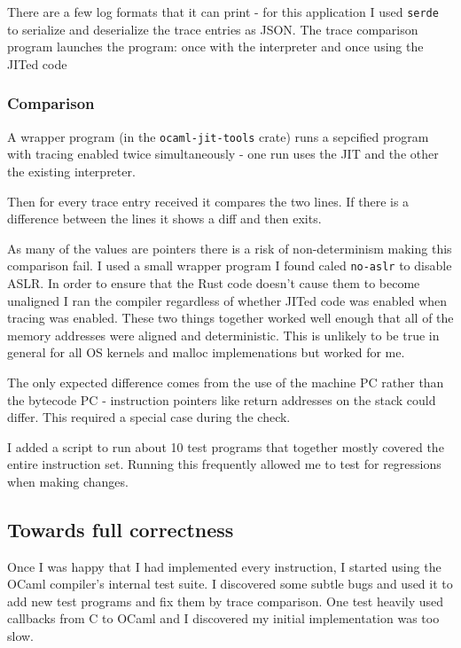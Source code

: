 There are a few log formats that it can print - for this application I used \texttt{serde} to
serialize and deserialize the trace entries as JSON. The trace comparison program launches the
program: once with the interpreter and once using the JITed code

\subsubsection{Comparison}

A wrapper program (in the \texttt{ocaml-jit-tools} crate) runs a sepcified program with
tracing enabled twice simultaneously - one run uses the JIT and the other the
existing interpreter.

Then for every trace entry received it compares the two lines. If there is a difference between the
lines
it shows a diff and then exits.

As many of the values are pointers there is a risk of non-determinism making this comparison fail.
I used a small wrapper program I found caled \texttt{no-aslr} to disable ASLR. In order to ensure
that the Rust code doesn't cause them to become unaligned I ran the compiler regardless of whether
JITed code was enabled when tracing was enabled. These two things together worked well enough that
all of the memory addresses were aligned and deterministic. This is unlikely to be true in general
for all OS kernels and malloc implemenations but worked for me.

The only expected difference comes from the use of the machine PC rather than the bytecode PC -
instruction pointers like return addresses on the stack could differ. This required a special case
during the check.

I added a script to run about 10 test programs that together mostly covered the entire instruction
set. Running this frequently allowed me to test for regressions when making changes.

\subsection{Towards full correctness}

Once I was happy that I had implemented every instruction, I started using
the OCaml compiler's internal test suite. I discovered some subtle bugs and used it to add new test
programs and fix them by trace comparison. One test heavily used callbacks from C to OCaml and I
discovered my initial implementation was too slow.

